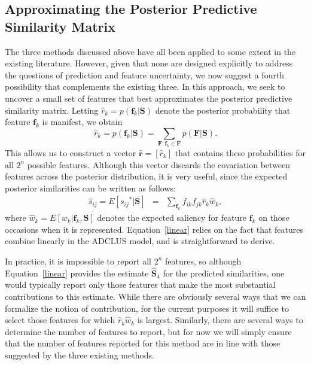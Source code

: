 \documentclass[11pt]{article}
\newcommand{\condon}{|}
\begin{document}
\subsection{Approximating the Posterior Predictive Similarity Matrix}

The three methods discussed above have all been applied to some extent in the existing literature. However, given that none are designed explicitly to address the questions of prediction and feature uncertainty, we now suggest a fourth possibility that complements the existing three. In this approach, we seek to uncover a small set of features that best approximates the posterior predictive similarity matrix. Letting $\hat{r}_k = p(\mathbf{f}_k \condon \mathbf{S})$ denote the posterior probability that feature $\mathbf{f}_k$ is manifest, we obtain
    \begin{equation}
    \hat{r}_k = p(\mathbf{f}_k \condon \mathbf{S}) = \sum_{\mathbf{F}: \mathbf{f}_k \in \mathbf{F}}
    p(\mathbf{F} \condon \mathbf{S}). \label{intpost}
    \end{equation}
This allows us to construct a vector $\hat{\mathbf{r}}=[\hat{r}_k]$ that contains these probabilities for all $2^n$ possible features. Although this vector discards the covariation between features across the posterior distribution, it is very useful, since the expected posterior similarities can be written as follows:
    \begin{eqnarray}
    \hat{s}_{ij} = E[{s_{ij}}^*|\mathbf{S}] &=& \sum_{\mathbf{f}_k} f_{ik} f_{jk} \hat{r}_k \hat{w}_k, \label{linear}
    \end{eqnarray}
where $\hat{w}_k = E\left[ w_k | \mathbf{f}_k, \mathbf{S} \right]$ denotes the expected saliency for feature $\mathbf{f}_k$ on those occasions when it is represented. Equation~\ref{linear} relies on the fact that features combine linearly in the ADCLUS model, and is straightforward to derive.

In practice, it is impossible to report all $2^n$ features, so although Equation~\ref{linear} provides the estimate  $\hat{\mathbf{S}}_4$ for the predicted similarities, one would typically report only those features that make the most substantial contributions to this estimate. While there are obviously several ways that we can formalize the notion of contribution, for the current purposes it will suffice to select those features for which $\hat{r}_k \hat{w}_k$ is largest. Similarly, there are several ways to determine the number of features to report, but for now we will simply ensure that the number of features reported for this method are in line with those suggested by the three existing methods.
\end{document}
